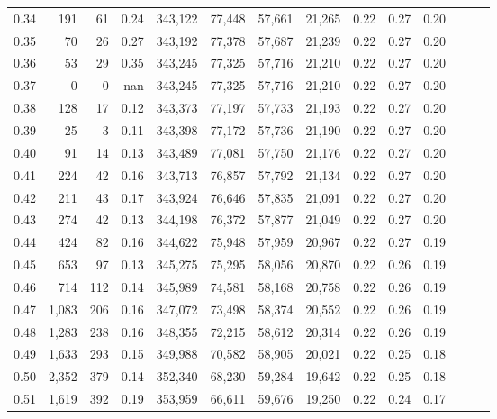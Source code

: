 \begin{tabular}{rrrrrrrrrrrrrr}
0.34 &     191 &     61 &  0.24 &  343,122 &   77,448 &  57,661 &  21,265 &  0.22 &  0.27 &      0.20 \\
0.35 &      70 &     26 &  0.27 &  343,192 &   77,378 &  57,687 &  21,239 &  0.22 &  0.27 &      0.20 \\
0.36 &      53 &     29 &  0.35 &  343,245 &   77,325 &  57,716 &  21,210 &  0.22 &  0.27 &      0.20 \\
0.37 &       0 &      0 &   nan &  343,245 &   77,325 &  57,716 &  21,210 &  0.22 &  0.27 &      0.20 \\
0.38 &     128 &     17 &  0.12 &  343,373 &   77,197 &  57,733 &  21,193 &  0.22 &  0.27 &      0.20 \\
0.39 &      25 &      3 &  0.11 &  343,398 &   77,172 &  57,736 &  21,190 &  0.22 &  0.27 &      0.20 \\
0.40 &      91 &     14 &  0.13 &  343,489 &   77,081 &  57,750 &  21,176 &  0.22 &  0.27 &      0.20 \\
0.41 &     224 &     42 &  0.16 &  343,713 &   76,857 &  57,792 &  21,134 &  0.22 &  0.27 &      0.20 \\
0.42 &     211 &     43 &  0.17 &  343,924 &   76,646 &  57,835 &  21,091 &  0.22 &  0.27 &      0.20 \\
0.43 &     274 &     42 &  0.13 &  344,198 &   76,372 &  57,877 &  21,049 &  0.22 &  0.27 &      0.20 \\
0.44 &     424 &     82 &  0.16 &  344,622 &   75,948 &  57,959 &  20,967 &  0.22 &  0.27 &      0.19 \\
0.45 &     653 &     97 &  0.13 &  345,275 &   75,295 &  58,056 &  20,870 &  0.22 &  0.26 &      0.19 \\
0.46 &     714 &    112 &  0.14 &  345,989 &   74,581 &  58,168 &  20,758 &  0.22 &  0.26 &      0.19 \\
0.47 &   1,083 &    206 &  0.16 &  347,072 &   73,498 &  58,374 &  20,552 &  0.22 &  0.26 &      0.19 \\
0.48 &   1,283 &    238 &  0.16 &  348,355 &   72,215 &  58,612 &  20,314 &  0.22 &  0.26 &      0.19 \\
0.49 &   1,633 &    293 &  0.15 &  349,988 &   70,582 &  58,905 &  20,021 &  0.22 &  0.25 &      0.18 \\
0.50 &   2,352 &    379 &  0.14 &  352,340 &   68,230 &  59,284 &  19,642 &  0.22 &  0.25 &      0.18 \\
0.51 &   1,619 &    392 &  0.19 &  353,959 &   66,611 &  59,676 &  19,250 &  0.22 &  0.24 &      0.17 \\

\end{tabular}
